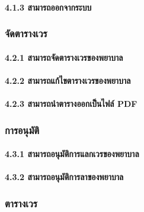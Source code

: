 \hspace{2.5cm}\paragraph{4.1.3 สามารถออกจากระบบ}

\clearpage

\hspace{1cm}\subsubsection{จัดตารางเวร}

\hspace{2.5cm}\paragraph{4.2.1 สามารถจัดตารางเวรของพยาบาล}

\hspace{2.5cm}\paragraph{4.2.2 สามารถแก้ไขตารางเวรของพยาบาล}

\hspace{2.5cm}\paragraph{4.2.3 สามารถนำตารางออกเป็นไฟล์ PDF}

\hspace{1cm}\subsubsection{การอนุมัติ}

\hspace{2.5cm}\paragraph{4.3.1 สามารถอนุมัติการแลกเวรของพยาบาล}

\hspace{2.5cm}\paragraph{4.3.2 สามารถอนุมัติการลาของพยาบาล}

\hspace{1cm}\subsubsection{ตารางเวร}

